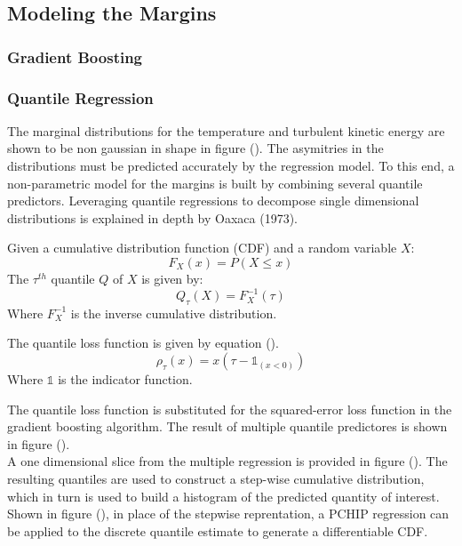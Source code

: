 \subsection{Modeling the Margins}

\subsubsection{Gradient Boosting}

\subsubsection{Quantile Regression}

The marginal distributions for the temperature and turbulent kinetic energy are shown to be non gaussian in shape in figure ().  The asymitries in the distributions must be predicted accurately by the regression model.  To this end, a non-parametric model for the margins is built by combining several quantile predictors.  Leveraging quantile regressions to decompose single dimensional distributions is explained in depth by Oaxaca (1973).

Given a cumulative distribution function (CDF) and a random variable $X$:
\begin{equation}
F_X(x) = P(X \leq x)
\end{equation}
The $\tau^{th}$ quantile $Q$ of $X$ is given by:
\begin{equation}
Q_\tau(X) = F_X^{-1}(\tau)
\end{equation}
Where $F_X^{-1}$ is the inverse cumulative distribution.

The quantile loss function is given by equation ().
\begin{equation}
\rho_\tau(x) = x(\tau - \mathbb{1}_{(x < 0)})
\end{equation}
Where $\mathbb{1}$ is the indicator function.

The quantile loss function is substituted for the squared-error loss function in the gradient boosting algorithm.  The result of multiple quantile predictores is shown in figure (). \\

A one dimensional slice from the multiple regression is provided in figure ().
The resulting quantiles are used to construct a step-wise cumulative distribution, which in turn is used to build a histogram of the predicted quantity of interest. \\

Shown in figure (), in place of the stepwise reprentation, a PCHIP regression can be applied to the discrete quantile estimate to generate a differentiable CDF.
